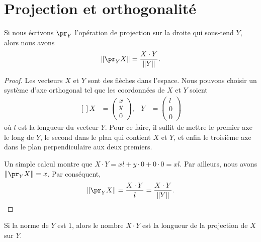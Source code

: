 \section{Projection et orthogonalité}

\begin{proposition}     \label{PropProjScal}
	Si nous écrivons \( \pr_Y\) l'opération de projection sur la droite qui sous-tend \( Y\), alors nous avons
	\begin{equation}
		\| \pr_YX \|=\frac{ X\cdot Y }{ \| Y \| }.
	\end{equation}
\end{proposition}

\begin{proof}
	Les vecteurs \( X\) et \( Y\) sont des flèches dans l'espace. Nous pouvons choisir un système d'axe orthogonal tel que les coordonnées de \( X\) et \( Y\) soient
	\begin{equation}
		\begin{aligned}[]
			X & =\begin{pmatrix}
				x \\
				y \\
				0
			\end{pmatrix},
			  & Y                            & =\begin{pmatrix}
				l \\
				0 \\
				0
			\end{pmatrix}
		\end{aligned}
	\end{equation}
	où \( l\) est la longueur du vecteur \( Y\). Pour ce faire, il suffit de mettre le premier axe le long de \( Y\), le second dans le plan qui contient \( X\) et \( Y\), et enfin le troisième axe dans le plan perpendiculaire aux deux premiers.

	Un simple calcul montre que \( X\cdot Y=xl+y\cdot 0+0\cdot 0=xl\). Par ailleurs, nous avons \( \| \pr_YX \|=x\). Par conséquent,
	\begin{equation}
		\| \pr_YX \|=\frac{ X\cdot Y }{ l }=\frac{ X\cdot Y }{ \| Y \| }.
	\end{equation}
\end{proof}

\begin{corollary}
	Si la norme de \( Y\) est \( 1\), alors le nombre \( X\cdot Y\) est la longueur de la projection de \( X\) sur \( Y\).
\end{corollary}

